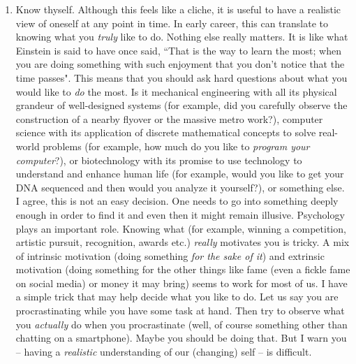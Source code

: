 \documentclass[a6paper]{article}
\begin{document}
\begin{enumerate}
    \item Know thyself. Although this feels like a cliche, it is useful to have a realistic view of oneself at any point in time. In early career, this can translate to knowing what you \emph{truly} like to do. Nothing else really matters. It is like what Einstein is said to have once said, ``That is the way to learn the most; when you are doing something with such enjoyment that you don't notice that the time passes". This means that you should ask hard questions about what you would like to \emph{do} the most. Is it mechanical engineering with all its physical grandeur of well-designed systems (for example, did you carefully observe the construction of a nearby flyover or the massive metro work?), computer science with its application of discrete mathematical concepts to solve real-world problems (for example, how much do you like to \emph{program your computer}?), or biotechnology with its promise to use technology to understand and enhance human life (for example, would you like to get your DNA sequenced and then would you analyze it yourself?), or something else. I agree, this is not an easy decision. One needs to go into something deeply enough in order to find it and even then it might remain illusive. Psychology plays an important role. Knowing what (for example, winning a competition, artistic pursuit, recognition, awards etc.) \emph{really} motivates you is tricky. A mix of intrinsic motivation (doing something \emph{for the sake of it}) and extrinsic motivation (doing something for the other things like fame (even a fickle fame on social media) or money it may bring) seems to work for most of us. I have a simple trick that may help decide what you like to do. Let us say you are procrastinating while you have some task at hand. Then try to observe what you \emph{actually} do when you procrastinate (well, of course something other than chatting on a smartphone). Maybe you should be doing that. But I warn you -- having a \emph{realistic} understanding of our (changing) self -- is difficult. 

\end{enumerate}
\end{document}

